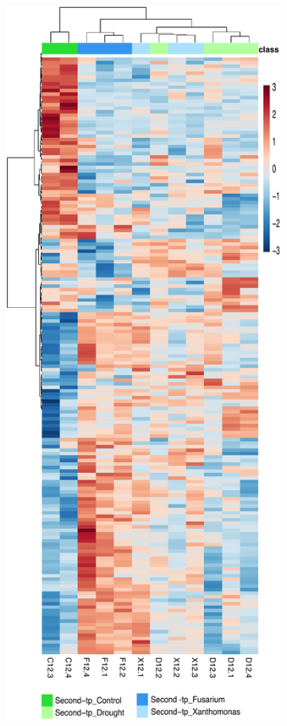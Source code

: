 \begin{figure}[!hptb]
  \centering
  \begin{subfigure}[b]{0.42\textwidth}
    \includegraphics[width=\textwidth]{Figures/heatmapofsigfeatures-ForThesis-Long.pdf}

\end{subfigure}
\end{figure}
